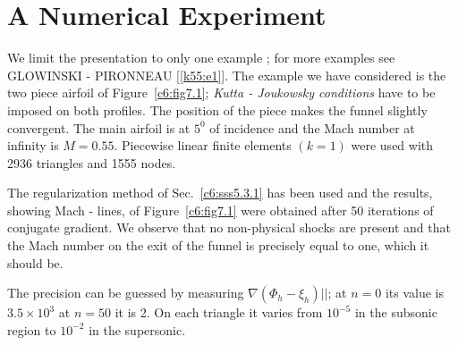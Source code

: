 \section{A Numerical Experiment}\label{c6:s7}%

We limit the presentation to only one example ; for more examples see 
GLOWINSKI - PIRONNEAU [\ref{k55:e1}]. The example we have considered is the two 
piece airfoil of Figure~\ref{c6:fig7.1}; \textit{Kutta - Joukowsky
  conditions} have  
to be imposed on both profiles. The position of the piece makes the 
funnel slightly convergent. The main airfoil is at $5^0$ of incidence 
and the Mach number at infinity is $M= 0.55$. Piecewise linear finite 
elements $(k=1)$ were used with 2936 triangles and 1555 nodes.     

The regularization method of Sec.~\ref{c6:sss5.3.1} has been used and the 
results, showing Mach - lines, of Figure~\ref{c6:fig7.1} were obtained after 50 
iterations of conjugate gradient. We observe that no non-physical shocks 
are present and that the Mach number on the exit of the funnel is 
precisely equal to one, which it should be.    

The precision can be guessed by measuring $\nabla (\Phi_h - 
\xi_h)||$; at $n=0$ its value is $3.5 \times 10^3$ at $n = 50$ it is 2. 
On each triangle it varies from $10^{-5}$ in the subsonic region to 
$10^{-2}$ in the supersonic.   
\pageoriginale

